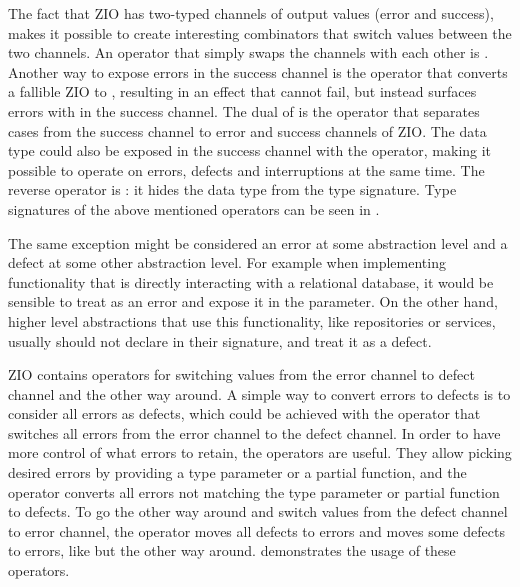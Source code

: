 The fact that ZIO has two-typed channels of output values (error and success), makes it possible to create interesting combinators that switch values between the two channels. An operator that simply swaps the channels with each other is . Another way to expose errors in the success channel is the  operator that converts a fallible ZIO to , resulting in an effect that cannot fail, but instead surfaces errors with  in the success channel. The dual of  is the operator  that separates  cases from the success channel to error and success channels of ZIO. The  data type could also be exposed in the success channel with the  operator, making it possible to operate on errors, defects and interruptions at the same time. The reverse operator is : it hides the  data type from the type signature. Type signatures of the above mentioned operators can be seen in .



The same exception might be considered an error at some abstraction level and a defect at some other abstraction level. For example when implementing functionality that is directly interacting with a relational database, it would be sensible to treat  as an error and expose it in the  parameter. On the other hand, higher level abstractions that use this functionality, like repositories or services, usually should not declare  in their signature, and treat it as a defect.

ZIO contains operators for switching values from the error channel to defect channel and the other way around. A simple way to convert errors to defects is to consider all errors as defects, which could be achieved with the  operator that switches all errors from the error channel to the defect channel. In order to have more control of what errors to retain, the  operators are useful. They allow picking desired errors by providing a type parameter or a partial function, and the operator converts all errors not matching the type parameter or partial function to defects. To go the other way around and switch values from the defect channel to error channel, the  operator moves all defects to errors and  moves some defects to errors, like  but the other way around.  demonstrates the usage of these operators.

